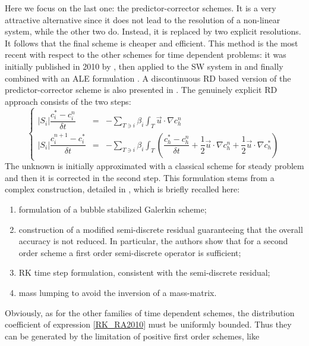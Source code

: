 Here we focus on the last one: the predictor-corrector schemes. It is a very attractive alternative since
it does not lead to the resolution of a non-linear system, while the other two do. Instead, it is replaced by two explicit resolutions.
It follows that the final scheme is cheaper and efficient. 
This method is the most recent with respect to the other schemes for time dependent problems:
it was initially published in 2010 by \citet{ricchiuto_explicit_2010}, then applied to the
SW system in \cite{ricchiuto_explicit_2015} and finally combined with an ALE formulation \cite{arpaia_ale_2015}.
A discontinuous RD based version of the predictor-corrector scheme is also presented in \cite{warzynski_rungekutta_2015}. 
The genuinely explicit RD approach consists of the two steps:
\begin{equation}
 \left\{
 \begin{array}{lcl}
  |S_i|\dfrac{c_i^*-c_i^n}{\delta t}& = & -\sum\limits_{T \ni i} \beta_i \displaystyle\int_T \vec{u}\cdot \nabla c_h^n \\
  |S_i|\dfrac{c_i^{n+1}-c_i^*}{\delta t} & = & -\sum\limits_{T \ni i} \beta_i \displaystyle\int_T \left(\dfrac{c_h^*-c_h^n}{\delta t}+\dfrac{1}{2}\vec{u}\cdot \nabla c_h^n+ \dfrac{1}{2}\vec{u}\cdot \nabla c_h^*\right)
 \end{array}\right .
\label{RK_RA2010}
\end{equation}
The unknown is initially approximated with a classical scheme for steady problem and then it is corrected in the second step.
This formulation stems from a complex construction, detailed in \cite{ricchiuto_explicit_2010}, which is briefly
recalled here:
\begin{enumerate}
 \item formulation of a bubble stabilized Galerkin scheme;
 \item construction of a modified semi-discrete residual guaranteeing that the overall accuracy is not reduced.
 In particular, the authors show that for a second order scheme a first order semi-discrete operator is sufficient;
 \item RK time step formulation, consistent with the semi-discrete residual;
 \item mass lumping to avoid the inversion of a mass-matrix.
\end{enumerate}
Obviously, as for the other families of time dependent schemes, the distribution coefficient of expression
\eqref{RK_RA2010} must be uniformly bounded. Thus they can be generated by the limitation of positive first order schemes, like

